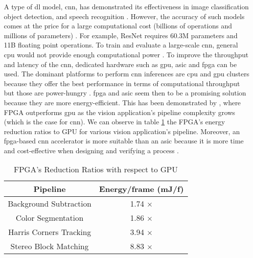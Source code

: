 A type of \acrshort{dl} model, \acrfull{cnn}, has demonstrated its effectiveness in image classiﬁcation object detection, and speech recognition \cite{shawahna_fpga-based_2019}. However, the accuracy of such models comes at the price for a large computational cost (billions of operations and millions of parameters) \cite{szegedy_going_2014}. For example, ResNet \cite{he_deep_2015} requires 60.3M parameters and 11B floating point operations. To train and evaluate a large-scale \acrshort{cnn}, general \acrfull{cpu} would not provide enough computational power \cite{liu_fpga-based_2019}. To improve the throughput and latency of the \acrshort{cnn}, dedicated hardware such as \acrfull{gpu}, \acrfull{asic} and \acrfull{fpga} can be used. The dominant platforms to perform \acrshort{cnn} inferences are \acrshort{cpu} and \acrshort{gpu} clusters because they offer the best performance in terms of computational throughput but those are power-hungry \cite{liu_uniform_2019}.
\acrshort{fpga} and \acrshort{asic} seem then to be a promising solution because they are more energy-efficient. This has been demonstrated by \textcite{qasaimeh_comparing_2019}, where FPGA outperforms \acrshort{gpu} as the vision application’s pipeline complexity grows (which is the case for \acrshort{cnn}). We can observe in table \ref{tab:benchener} the FPGA’s energy reduction ratios to GPU for various vision application’s pipeline. Moreover, an \acrshort{fpga}-based \acrshort{cnn} accelerator is more suitable than an \acrshort{asic} because it is more time and cost-effective when designing and verifying a process \cite{motamedi_placid_2017}.
%
\begin{table}
    \center
    \begin{tabular}{|c|c|}
        \hline
        Pipeline & Energy/frame (mJ/f) \\
        \hline
        Background Subtraction & 1.74 $\times$\\
        \hline
        Color Segmentation & 1.86 $\times$ \\
        \hline
        Harris Corners Tracking & 3.94 $\times$ \\
        \hline
        Stereo Block Matching & 8.83 $\times$ \\
        \hline
    \end{tabular}
    \caption{FPGA’s Reduction Ratios with respect to GPU \cite{qasaimeh_comparing_2019}}
    \label{tab:benchener}
\end{table}

